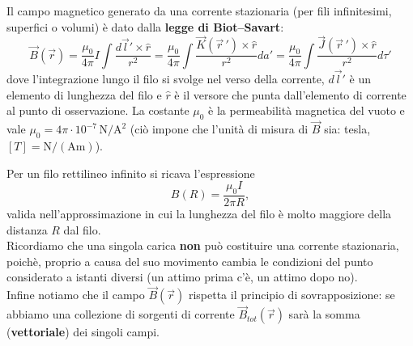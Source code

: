 \documentclass{book}
\begin{document}
Il campo magnetico generato da una corrente stazionaria (per fili infinitesimi, superfici o volumi) \`e dato dalla \textbf{legge di Biot--Savart}:
$$ \vec B(\vec r) = \frac{\mu_0}{4\pi}I\int\frac{d\vec l'\times\hat r}{r^2} = \frac{\mu_0}{4\pi}\int\frac{\vec K(\vec r\,')\times\hat r}{r^2} da' = \frac{\mu_0}{4\pi}\int\frac{\vec J(\vec r\,')\times\hat r}{r^2} d\tau' 
$$
dove l'integrazione lungo il filo si svolge nel verso della corrente, $d\vec l'$ \`e un elemento di lunghezza del filo e $\hat r$ \`e il versore che punta dall'elemento di corrente al punto di osservazione. La costante $\mu_0$ \`e la permeabilit\`a magnetica del vuoto e vale $\mu_0=4\pi\cdot10^{-7}\,\mathrm{N/A^2}$ (ciò impone che l'unit\`a di misura di $\vec{B}$ sia: tesla, $[T]=\mathrm{N/(Am)}$).
\begin{center}
\end{center}
Per un filo rettilineo infinito si ricava l'espressione
$$
B(R) = \frac{\mu_0 I}{2\pi R},
$$
valida nell'approssimazione in cui la lunghezza del filo \`e molto maggiore della distanza $R$ dal filo.
\\
Ricordiamo che una singola carica \textbf{non} può costituire una corrente stazionaria, poichè, proprio a causa del suo movimento
cambia le condizioni del punto considerato a istanti diversi (un attimo prima c'è, un attimo dopo no).
\\
Infine notiamo che il campo $\vec{B}(\vec{r})$ rispetta il principio di sovrapposizione: se abbiamo una collezione di sorgenti di corrente
$\vec{B}_{tot}(\vec{r})$ sarà la somma (\textbf{vettoriale}) dei singoli campi.
\end{document}
